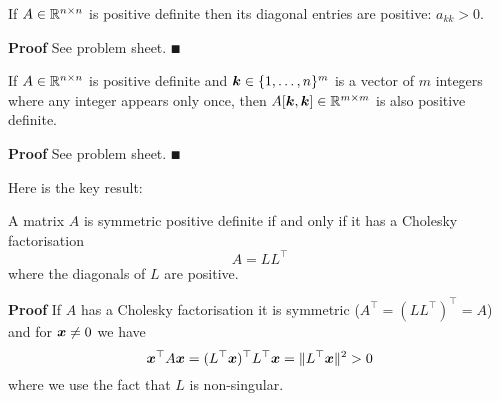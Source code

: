\begin{proposition} If $A \in {\mathbb R}^{n \times n}$ is positive definite then its diagonal entries are positive: $a_{kk} > 0$. \end{proposition}
\textbf{Proof} See problem sheet. \ensuremath{\QED}

\begin{theorem} If $A \in {\mathbb R}^{n \times n}$ is positive definite and $\bm{{\mbox{\boldmath$k$\unboldmath}}} \in \{1,\ldots,n\}^m$ is a vector of $m$ integers where any integer appears only once,  then $A[\bm{{\mbox{\boldmath$k$\unboldmath}}},\bm{{\mbox{\boldmath$k$\unboldmath}}}] \in {\mathbb R}^{m \times m}$ is also positive definite. \end{theorem}
\textbf{Proof} See problem sheet. \ensuremath{\QED}

Here is the key result:

\begin{theorem} A matrix $A$ is symmetric positive definite if and only if it has a Cholesky factorisation
\[
A = L L^\ensuremath{\top}
\]
where the diagonals of $L$ are positive.

\end{theorem}
\textbf{Proof} If $A$ has a Cholesky factorisation it is symmetric ($A^\ensuremath{\top} = (L L^\ensuremath{\top})^\ensuremath{\top} = A$) and for $\bm{{\mbox{\boldmath$x$\unboldmath}}} \neq 0$ we have
\[
\bm{{\mbox{\boldmath$x$\unboldmath}}}^\top A \bm{{\mbox{\boldmath$x$\unboldmath}}} = (L^\top\bm{{\mbox{\boldmath$x$\unboldmath}}})^\top L^\top \bm{{\mbox{\boldmath$x$\unboldmath}}} = \|L^\top\bm{{\mbox{\boldmath$x$\unboldmath}}}\|^2 > 0
\]
where we use the fact that $L$ is non-singular.


